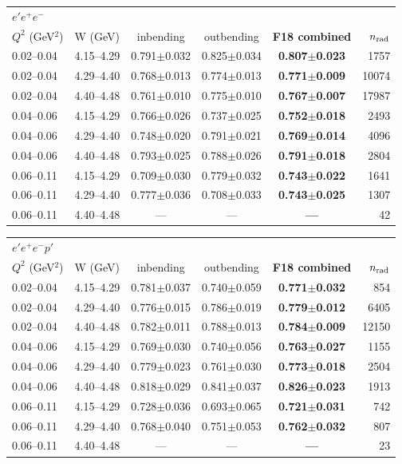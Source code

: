 \begin{tabular}{llcccr}\toprule
\multicolumn{6}{l}{$e'e^+e^-$}\\
$Q^2$ (GeV$^2$) & W (GeV) & inbending & outbending & \textbf{F18 combined} & $n_{\rm rad}$ \\\midrule
0.02--0.04 & 4.15--4.29 & 0.791$\pm$0.032 & 0.825$\pm$0.034 & \textbf{0.807$\pm$0.023} & 1757 \\
0.02--0.04 & 4.29--4.40 & 0.768$\pm$0.013 & 0.774$\pm$0.013 & \textbf{0.771$\pm$0.009} & 10074 \\
0.02--0.04 & 4.40--4.48 & 0.761$\pm$0.010 & 0.775$\pm$0.010 & \textbf{0.767$\pm$0.007} & 17987 \\
0.04--0.06 & 4.15--4.29 & 0.766$\pm$0.026 & 0.737$\pm$0.025 & \textbf{0.752$\pm$0.018} & 2493 \\
0.04--0.06 & 4.29--4.40 & 0.748$\pm$0.020 & 0.791$\pm$0.021 & \textbf{0.769$\pm$0.014} & 4096 \\
0.04--0.06 & 4.40--4.48 & 0.793$\pm$0.025 & 0.788$\pm$0.026 & \textbf{0.791$\pm$0.018} & 2804 \\
0.06--0.11 & 4.15--4.29 & 0.709$\pm$0.030 & 0.779$\pm$0.032 & \textbf{0.743$\pm$0.022} & 1641 \\
0.06--0.11 & 4.29--4.40 & 0.777$\pm$0.036 & 0.708$\pm$0.033 & \textbf{0.743$\pm$0.025} & 1307 \\
0.06--0.11 & 4.40--4.48 & --- & --- & \textbf{---} & 42 \\
\bottomrule\end{tabular}

\medskip

\begin{tabular}{llcccr}\toprule
\multicolumn{6}{l}{$e'e^+e^-p'$}\\
$Q^2$ (GeV$^2$) & W (GeV) & inbending & outbending & \textbf{F18 combined} & $n_{\rm rad}$ \\\midrule
0.02--0.04 & 4.15--4.29 & 0.781$\pm$0.037 & 0.740$\pm$0.059 & \textbf{0.771$\pm$0.032} & 854 \\
0.02--0.04 & 4.29--4.40 & 0.776$\pm$0.015 & 0.786$\pm$0.019 & \textbf{0.779$\pm$0.012} & 6405 \\
0.02--0.04 & 4.40--4.48 & 0.782$\pm$0.011 & 0.788$\pm$0.013 & \textbf{0.784$\pm$0.009} & 12150 \\
0.04--0.06 & 4.15--4.29 & 0.769$\pm$0.030 & 0.740$\pm$0.056 & \textbf{0.763$\pm$0.027} & 1155 \\
0.04--0.06 & 4.29--4.40 & 0.779$\pm$0.023 & 0.761$\pm$0.030 & \textbf{0.773$\pm$0.018} & 2504 \\
0.04--0.06 & 4.40--4.48 & 0.818$\pm$0.029 & 0.841$\pm$0.037 & \textbf{0.826$\pm$0.023} & 1913 \\
0.06--0.11 & 4.15--4.29 & 0.728$\pm$0.036 & 0.693$\pm$0.065 & \textbf{0.721$\pm$0.031} & 742 \\
0.06--0.11 & 4.29--4.40 & 0.768$\pm$0.040 & 0.751$\pm$0.053 & \textbf{0.762$\pm$0.032} & 807 \\
0.06--0.11 & 4.40--4.48 & --- & --- & \textbf{---} & 23 \\
\bottomrule\end{tabular}

\medskip

